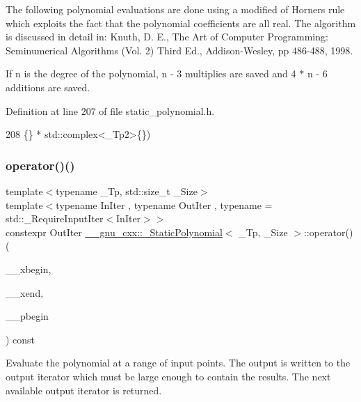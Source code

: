 The following polynomial evaluations are done using a modified of Horner\textquotesingle{}s rule which exploits the fact that the polynomial coefficients are all real. The algorithm is discussed in detail in\+: Knuth, D. E., The Art of Computer Programming\+: Seminumerical Algorithms (Vol. 2) Third Ed., Addison-\/\+Wesley, pp 486-\/488, 1998.

If n is the degree of the polynomial, n -\/ 3 multiplies are saved and 4 $\ast$ n -\/ 6 additions are saved. 

Definition at line 207 of file static\+\_\+polynomial.\+h.


\begin{DoxyCode}
208                               \{\} * std::complex<\_Tp2>\{\})
\end{DoxyCode}
\mbox{\label{class____gnu__cxx_1_1__StaticPolynomial_a0a3640688cb677fdc30a6035e38642cb}} 
\subsubsection{\texorpdfstring{operator()()}{operator()()}\hspace{0.1cm}{\footnotesize\ttfamily [4/4]}}
{\footnotesize\ttfamily template$<$typename \+\_\+\+Tp, std\+::size\+\_\+t \+\_\+\+Size$>$ \\
template$<$typename In\+Iter , typename Out\+Iter , typename  = std\+::\+\_\+\+Require\+Input\+Iter$<$\+In\+Iter$>$$>$ \\
constexpr Out\+Iter \hyperlink{class____gnu__cxx_1_1__StaticPolynomial}{\+\_\+\+\_\+gnu\+\_\+cxx\+::\+\_\+\+Static\+Polynomial}$<$ \+\_\+\+Tp, \+\_\+\+Size $>$\+::operator() (\begin{DoxyParamCaption}\item[{const In\+Iter \&}]{\+\_\+\+\_\+xbegin,  }\item[{const In\+Iter \&}]{\+\_\+\+\_\+xend,  }\item[{Out\+Iter \&}]{\+\_\+\+\_\+pbegin }\end{DoxyParamCaption}) const\hspace{0.3cm}{\ttfamily [inline]}}

Evaluate the polynomial at a range of input points. The output is written to the output iterator which must be large enough to contain the results. The next available output iterator is returned. 

